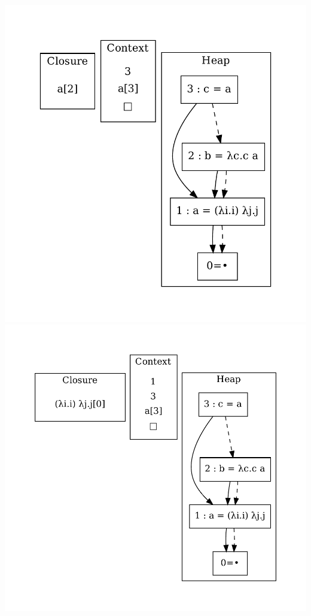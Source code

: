 \includegraphics[width=0.99\linewidth/2]{figures/11.pdf}
\includegraphics[width=0.99\linewidth/2]{figures/12.pdf}
